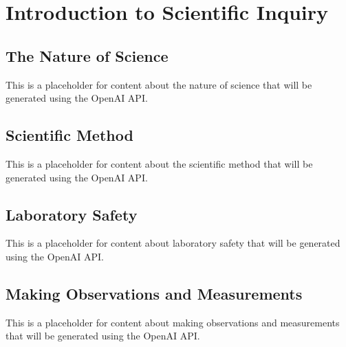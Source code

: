 \chapter{Introduction to Scientific Inquiry}


\section{The Nature of Science}

This is a placeholder for content about the nature of science that will be generated using the OpenAI API.

\section{Scientific Method}

This is a placeholder for content about the scientific method that will be generated using the OpenAI API.

\section{Laboratory Safety}

This is a placeholder for content about laboratory safety that will be generated using the OpenAI API.

\section{Making Observations and Measurements}

This is a placeholder for content about making observations and measurements that will be generated using the OpenAI API.
